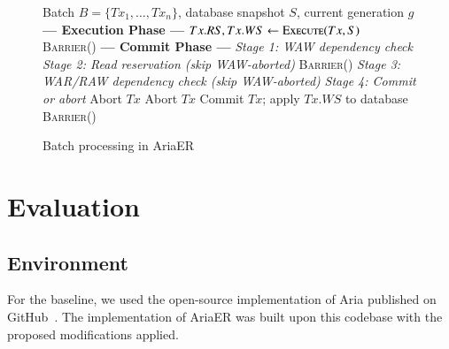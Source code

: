 \documentclass[english,preprint,JIP]{ipsj}
\begin{document}
\begin{figure}[!t]
\begin{algorithm}[H]
    \caption{Batch processing in AriaER}
    \label{alg3}
    \begin{algorithmic}[1]
    \Require Batch $B = \{Tx_1, \ldots, Tx_n\}$, database snapshot $S$, current generation $g$
    \Statex \textbf{--- Execution Phase ---}
        \State $Tx.RS, Tx.WS \gets \textsc{Execute}(Tx, S)$
        \State {}
    \EndFor
    \State \textsc{Barrier}()
    \Statex
    \Statex \textbf{--- Commit Phase ---}
    \Statex \textit{Stage 1: WAW dependency check}
        \State {}
    \EndFor
    \Statex
    \Statex \textit{Stage 2: Read reservation (skip WAW-aborted)}
            \State {}
        \EndIf
    \EndFor
    \State \textsc{Barrier}()
    \Statex
    \Statex \textit{Stage 3: WAR/RAW dependency check (skip WAW-aborted)}
            \State {}
            \State {}
        \EndIf
    \EndFor
    \Statex
    \Statex \textit{Stage 4: Commit or abort}
            \State Abort $Tx$
            \State Abort $Tx$
        \Else
            \State Commit $Tx$; apply $Tx.WS$ to database
        \EndIf
    \EndFor
    \State \textsc{Barrier}()
    \end{algorithmic}
\end{algorithm}
\end{figure}


\section{Evaluation}
\subsection{Environment}
For the baseline, we used the open-source implementation of Aria published on GitHub~\cite{lu2020aria_github}. The implementation of AriaER was built upon this codebase with the proposed modifications applied.
\end{document}
